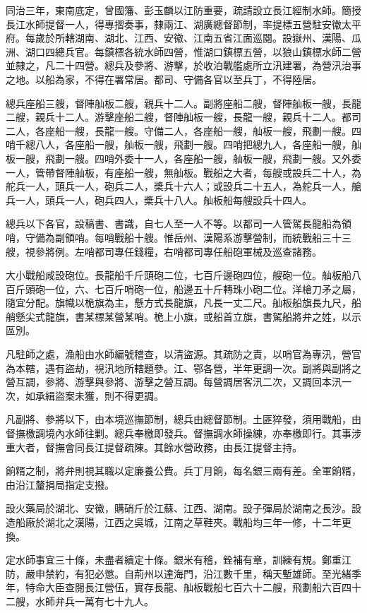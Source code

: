 \begin{pinyinscope}
同治三年，東南底定，曾國籓、彭玉麟以江防重要，疏請設立長江經制水師。簡授長江水師提督一人，得專摺奏事，隸兩江、湖廣總督節制，率提標五營駐安徽太平府。每歲於所轄湖南、湖北、江西、安徽、江南五省江面巡閱。設嶽州、漢陽、瓜洲、湖口四總兵官。每鎮標各統水師四營，惟湖口鎮標五營，以狼山鎮標水師二營並隸之，凡二十四營。總兵及參將、游擊，於收泊戰艦處所立汛建署，為營汛治事之地。以船為家，不得在署常居。都司、守備各官以至兵丁，不得陸居。

總兵座船三艘，督陣舢板二艘，親兵十二人。副將座船二艘，督陣舢板一艘，長龍二艘，親兵十二人。游擊座船二艘，督陣舢板一艘，長龍一艘，親兵十二人。都司二人，各座船一艘，長龍一艘。守備二人，各座船一艘，舢板一艘，飛劃一艘。四哨千總八人，各座船一艘，舢板一艘，飛劃一艘。四哨把總九人，各座船一艘，舢板一艘，飛劃一艘。四哨外委十一人，各座船一艘，舢板一艘，飛劃一艘。又外委一人，管帶督陣舢板，有座船一艘，無舢板。戰船之大者，每艘或設兵二十人，為舵兵一人，頭兵一人，砲兵二人，槳兵十六人；或設兵二十五人，為舵兵一人，艙兵一人，頭兵一人，砲兵四人，槳兵十八人。舢板船每艘設兵十四人。

總兵以下各官，設稿書、書識，自七人至一人不等。以都司一人管駕長龍船為領哨，守備為副領哨。每哨戰船十艘。惟岳州、漢陽系游擊營制，而統戰船三十三艘，視參將例。左哨都司專任錢糧，右哨都司專任船砲軍械及巡查諸務。

大小戰船咸設砲位。長龍船千斤頭砲二位，七百斤邊砲四位，艘砲一位。舢板船八百斤頭砲一位，六、七百斤哨砲一位，船邊五十斤轉珠小砲二位。洋槍刀矛之屬，隨宜分配。旗幟以桅旗為主，懸方式長龍旗，凡長一丈二尺。舢板船旗長九尺，船艄懸尖式龍旗，書某標某營某哨。桅上小旗，或船首立旗，書駕船將弁之姓，以示區別。

凡駐師之處，漁船由水師編號稽查，以清盜源。其疏防之責，以哨官為專汛，營官為本轄，遇有盜劫，視汛地所轄題參。江、鄂各營，半年更調一次。副將與副將之營互調，參將、游擊與參將、游擊之營互調。每營調居客汛二次，又調回本汛一次，如承緝盜案未獲，則不得更調。

凡副將、參將以下，由本境巡撫節制，總兵由總督節制。土匪猝發，須用戰船，由督撫檄調境內水師往剿。總兵奉檄即發兵。督撫調水師操練，亦奉檄即行。其事涉重大者，督撫會同長江提督疏陳。其餘水營政務，由長江提督主持。

餉糈之制，將弁則視其職以定廉養公費。兵丁月餉，每名銀三兩有差。全軍餉糈，由沿江釐捐局指定支撥。

設火藥局於湖北、安徽，購硝斤於江蘇、江西、湖南。設子彈局於湖南之長沙。設造船廠於湖北之漢陽，江西之吳城，江南之草鞋夾。戰船均三年一修，十二年更換。

定水師事宜三十條，未盡者續定十條。銀米有稽，銓補有章，訓練有規。鄭重江防，嚴申禁約，有犯必懲。自荊州以達海門，沿江數千里，稱天塹雄師。至光緒季年，特命大臣查閱長江營伍，實存長龍、舢板戰船七百六十二艘，飛劃船六百四十二艘，水師弁兵一萬有七十九人。


\end{pinyinscope}
